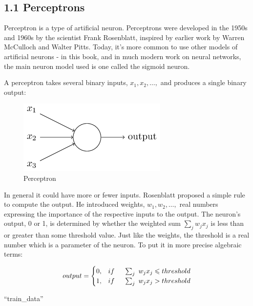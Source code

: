 \documentclass[12 pt]{article}
\begin{document}
\subsection{1.1 Perceptrons}\label{perceptrons}

Perceptron is a type of artificial neuron. Perceptrons were developed in
the 1950s and 1960s by the scientist Frank Rosenblatt, inspired by
earlier work by Warren McCulloch and Walter Pitts. Today, it's more
common to use other models of artificial neurons - in this book, and in
much modern work on neural networks, the main neuron model used is one
called the sigmoid neuron.

A perceptron takes several binary inputs, $ x_1, x_2, \ldots{}, $
and produces a single binary output:

\begin{figure}[htp]
\centering
\includegraphics{./figs/tikz0.png}
\caption{Perceptron}
\end{figure}

In general it could have more or fewer inputs. Rosenblatt proposed a
simple rule to compute the output. He introduced weights,
$ w_1,w_2,\ldots{},$ real numbers expressing the importance of the respective
inputs to the output. The neuron's output, 0 or 1, is determined by
whether the weighted sum $ \sum_j w_j x_j $ is less than or
greater than some threshold value. Just like the weights, the threshold
is a real number which is a parameter of the neuron. To put it in more
precise algebraic terms:

\begin{equation}
        output =
        \begin{cases}
            0,& if \hspace{0.5 cm} \sum_j\ w_jx_j \leqslant threshold \\
            1,& if \hspace{0.5 cm} \sum_j\ w_jx_j > threshold
        \end{cases}
\end{equation}

``train_data''
\end{document}
